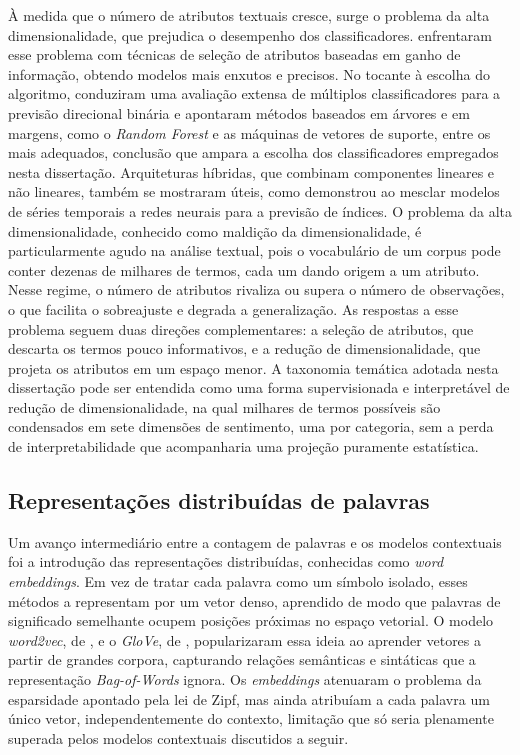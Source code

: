 À medida que o número de atributos textuais cresce, surge o problema da alta dimensionalidade, que prejudica o desempenho dos classificadores.  enfrentaram esse problema com técnicas de seleção de atributos baseadas em ganho de informação, obtendo modelos mais enxutos e precisos. No tocante à escolha do algoritmo,  conduziram uma avaliação extensa de múltiplos classificadores para a previsão direcional binária e apontaram métodos baseados em árvores e em margens, como o \textit{Random Forest} e as máquinas de vetores de suporte, entre os mais adequados, conclusão que ampara a escolha dos classificadores empregados nesta dissertação. Arquiteturas híbridas, que combinam componentes lineares e não lineares, também se mostraram úteis, como demonstrou  ao mesclar modelos de séries temporais a redes neurais para a previsão de índices. O problema da alta dimensionalidade, conhecido como maldição da dimensionalidade, é particularmente agudo na análise textual, pois o vocabulário de um corpus pode conter dezenas de milhares de termos, cada um dando origem a um atributo. Nesse regime, o número de atributos rivaliza ou supera o número de observações, o que facilita o sobreajuste e degrada a generalização. As respostas a esse problema seguem duas direções complementares: a seleção de atributos, que descarta os termos pouco informativos, e a redução de dimensionalidade, que projeta os atributos em um espaço menor. A taxonomia temática adotada nesta dissertação pode ser entendida como uma forma supervisionada e interpretável de redução de dimensionalidade, na qual milhares de termos possíveis são condensados em sete dimensões de sentimento, uma por categoria, sem a perda de interpretabilidade que acompanharia uma projeção puramente estatística.

\subsection{Representações distribuídas de palavras}

Um avanço intermediário entre a contagem de palavras e os modelos contextuais foi a introdução das representações distribuídas, conhecidas como \textit{word embeddings}. Em vez de tratar cada palavra como um símbolo isolado, esses métodos a representam por um vetor denso, aprendido de modo que palavras de significado semelhante ocupem posições próximas no espaço vetorial. O modelo \textit{word2vec}, de , e o \textit{GloVe}, de , popularizaram essa ideia ao aprender vetores a partir de grandes corpora, capturando relações semânticas e sintáticas que a representação \textit{Bag-of-Words} ignora. Os \textit{embeddings} atenuaram o problema da esparsidade apontado pela lei de Zipf, mas ainda atribuíam a cada palavra um único vetor, independentemente do contexto, limitação que só seria plenamente superada pelos modelos contextuais discutidos a seguir.

